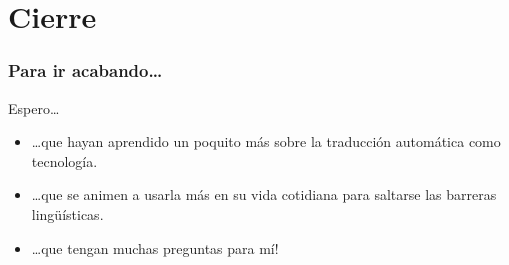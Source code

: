 \documentclass{beamer}
\begin{document}
\section{Cierre}

\begin{frame}
\frametitle{Para ir acabando\ldots}

Espero\ldots
\begin{itemize}
\item \ldots que hayan aprendido un poquito más sobre la traducción automática como tecnología.
\item \ldots que se animen a usarla más en su vida cotidiana para saltarse las barreras lingüísticas.
\item \ldots que tengan muchas preguntas para mí!
\end{itemize}

\end{frame}
\end{document}
